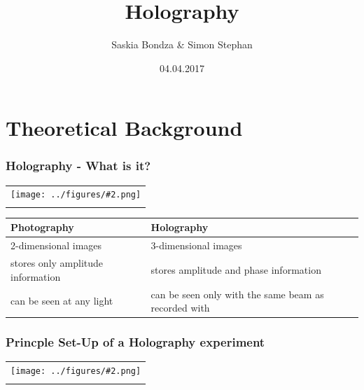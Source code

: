 \documentclass[10pt]{beamer}
\title{Holography}
\author{Saskia Bondza \& Simon Stephan}
\date{04.04.2017}
\newcommand{\gra}[3][]{
	\begin{table}
	\centering
	\begin{tabular}[width=\textwidth]{c}
		\texttt{[image: ../figures/\#2.png]}\\
		\small #3
	\end{tabular}
	\end{table}
}
\begin{document}
\maketitle
\frame{\tableofcontents}
\section{Theoretical Background}
\frame{\tableofcontents[currentsection]}
\begin{frame}
	\frametitle{Holography - What is it?}
	\gra[0.35]{holo-schach}{}
		\begin{tabular}{p{5cm}|p{5cm}}
			\textbf{Photography}&\textbf{Holography}\\\hline
			2-dimensional images&3-dimensional images\\\hline
			stores only amplitude information&stores amplitude and phase information\\\hline
			can be seen at any light&can be seen only with the same beam as recorded with
		\end{tabular}
\end{frame}

\begin{frame}
	\frametitle{Princple Set-Up of a Holography experiment}
	\gra[0.8]{PrincipleSetUp}{}
\end{frame}

\end{document}

